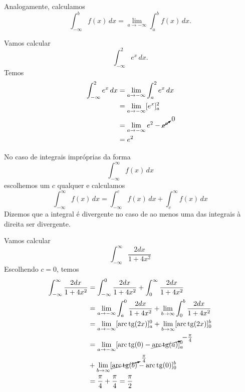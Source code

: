 Analogamente, calculamos
\begin{equation}
  \int_{-\infty}^{b}f(x)\,dx = \lim_{a\to -\infty}\int_a^bf(x)\,dx.
\end{equation}

\begin{ex}
  Vamos calcular
  \begin{equation}
    \int_{-\infty}^2e^{x}\,dx.
  \end{equation}
  Temos
  \begin{align}
    \int_{-\infty}^2e^{x}\,dx &= \lim_{a\to -\infty}\int_a^2e^{x}\,dx\\
                              &= \lim_{a\to -\infty} [e^x]_a^2\\
                              &= \lim_{a\to -\infty} e^2 - \cancelto{0}{e^a}\\
                              &= e^2
  \end{align}
\end{ex}

No caso de integrais impróprias da forma
\begin{equation}
  \int_{-\infty}^\infty f(x)\,dx
\end{equation}
escolhemos um $c$ qualquer e calculamos
\begin{equation}
  \int_{-\infty}^\infty f(x)\,dx = \int_{-\infty}^c f(x)\,dx + \int_{c}^\infty f(x)\,dx
\end{equation}
Dizemos que a integral é divergente no caso de ao menos uma das integrais à direita ser divergente.

\begin{ex}
  Vamos calcular
  \begin{equation}
    \int_{-\infty}^\infty \frac{2dx}{1+4x^2}
  \end{equation}
  Escolhendo $c=0$, temos
  \begin{align}
    \int_{-\infty}^\infty \frac{2dx}{1+4x^2} &= \int_{-\infty}^0 \frac{2dx}{1+4x^2} + \int_{0}^\infty \frac{2dx}{1+4x^2}\\
                                             &= \lim_{a\to -\infty}\int_a^0\frac{2dx}{1+4x^2} + \lim_{b\to\infty}\int_{0}^b \frac{2dx}{1+4x^2}\\
                                             &= \lim_{a\to -\infty}[\operatorname{arc}\operatorname{tg}(2x)]_a^0 + \lim_{b\to\infty}[\operatorname{arc}\operatorname{tg}(2x)]_0^b\\
                                             &= \lim_{a\to -\infty}[\operatorname{arc}\operatorname{tg}(0) - \cancelto{-\frac{\pi}{4}}{\operatorname{arc}\operatorname{tg}(a)}]_a^0 \\
                                             &+ \lim_{b\to\infty}[\cancelto{\frac{\pi}{4}}{\operatorname{arc}\operatorname{tg}(b)} - \operatorname{arc}\operatorname{tg}(0)]_0^b\\
                                             &= \frac{\pi}{4} + \frac{\pi}{4} = \frac{\pi}{2}
  \end{align}
\end{ex}

